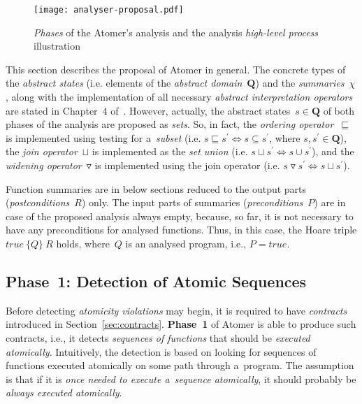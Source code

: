 \begin{figure}[hbt]
    \centering
    \texttt{[image: analyser-proposal.pdf]}
    \caption{%
        \emph{Phases} of the Atomer's analysis and the analysis
        \emph{high-level process} illustration%
    }
    \label{fig:atomerPhasesSequences}
\end{figure}

This section describes the proposal of Atomer in general. The concrete types
of the \emph{abstract states} (i.e. elements of the \emph{abstract
domain}~$ \boldsymbol{Q} $) and the \emph{summaries}~$ \chi $, along with the
implementation of all necessary \emph{abstract interpretation operators}
are stated in Chapter~4 of~\cite{harmimBP}. However, actually, the abstract
states~$ s \in \boldsymbol{Q} $ of both phases of the analysis are proposed as
\emph{sets}. So, in fact, the \emph{ordering operator}~$ \sqsubseteq $ is
implemented using testing for a~\emph{subset} (i.e. $ s \sqsubseteq s^\prime
\Leftrightarrow s \subseteq s^\prime $, where $ s, s^\prime \in
\boldsymbol{Q} $), the \emph{join operator}~$ \sqcup $ is implemented as the
\emph{set union} (i.e. $ s \sqcup s^\prime \Leftrightarrow s \cup s^\prime $),
and the \emph{widening operator}~$ \triangledown $ is implemented using the
join operator (i.e. $ s \triangledown s^\prime \Leftrightarrow s \sqcup
s^\prime $).

Function summaries are in below sections reduced to the output parts
(\emph{postconditions}~$ R $) only. The input parts of summaries
(\emph{preconditions}~$ P $) are in case of the proposed analysis always empty,
because, so far, it is not necessary to have any preconditions for analysed
functions. Thus, in this case, the Hoare triple ${ true\ \{Q\}\ R }$ holds,
where~$ Q $ is an analysed program, i.e., $ P = true $.

\subsection{Phase~1: Detection of Atomic Sequences}

Before detecting \emph{atomicity violations} may begin, it is required to have
\emph{contracts} introduced in Section~\ref{sec:contracts}. \textbf{Phase~1}
of Atomer is able to produce such contracts, i.e., it detects \emph{sequences
of functions} that should be \emph{executed atomically}. Intuitively, the
detection is based on looking for sequences of functions executed atomically
on some path through a~program. The assumption is that if it is \emph{once
needed to execute a~sequence atomically}, it should probably be \emph{always
executed atomically}.

